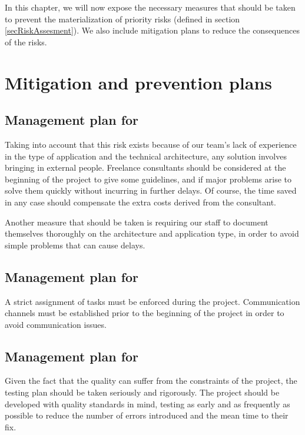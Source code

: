 
In this chapter, we will now expose the necessary measures that should be taken to prevent the materialization of priority risks (defined in section \ref{secRiskAssesment}). We also include mitigation plans to reduce the consequences of the risks.

\section{Mitigation and prevention plans}

\subsection{Management plan for }

Taking into account that this risk exists because of our team's lack of experience in the type of application and the technical architecture, any solution involves bringing in external people. Freelance consultants should be considered at the beginning of the project to give some guidelines, and if major problems arise to solve them quickly without incurring in further delays. Of course, the time saved in any case should compensate the extra costs derived from the consultant.

Another measure that should be taken is requiring our staff to document themselves thoroughly on the architecture and application type, in order to avoid simple problems that can cause delays.

\subsection{Management plan for }

A strict assignment of tasks must be enforced during the project. Communication channels must be established prior to the beginning of the project in order to avoid communication issues.

\subsection{Management plan for }

Given the fact that the quality can suffer from the constraints of the project, the testing plan should be taken seriously and rigorously. The project should be developed with quality standards in mind, testing as early and as frequently as possible to reduce the number of errors introduced and the mean time to their fix.


